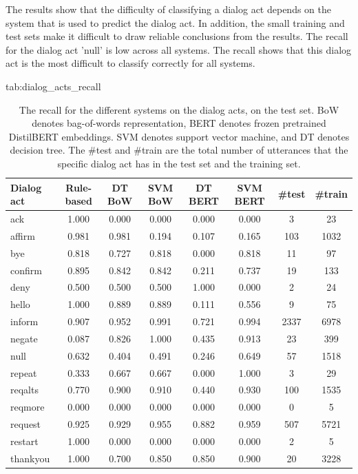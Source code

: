 \documentclass{midl} %
\begin{document}
The results show that the difficulty of classifying a dialog act depends on the system that is used to predict the dialog act.
In addition, the small training and test sets make it difficult to draw reliable conclusions from the results.
The recall for the dialog act 'null' is low across all systems. The recall shows that this dialog act is the most difficult to classify correctly for all systems.


\begin{table}[htbp]
\centering
\floatconts
  {tab:dialog_acts_recall}%
  {\caption{
    The recall for the different systems on the dialog acts, on the test set. BoW denotes bag-of-words representation, 
    BERT denotes frozen pretrained DistilBERT embeddings. 
    SVM denotes support vector machine, and DT denotes decision tree.
    The \#test and \#train are the total number of utterances that the specific dialog act has in the test set and the training set.
  }}%
  {\begin{tabular}{lccccccc}
  \bfseries Dialog act & \bfseries Rule-based & \bfseries DT BoW & 
  \bfseries SVM BoW & \bfseries DT BERT & \bfseries SVM BERT &
  \bfseries \#test & \bfseries \#train \\ 
  \hline
  ack       & 1.000 & 0.000 & 0.000 & 0.000 & 0.000 & 3 & 23 \\
  affirm    & 0.981 & 0.981 & 0.194 & 0.107 & 0.165 & 103 & 1032 \\
  bye       & 0.818 & 0.727 & 0.818 & 0.000 & 0.818 & 11 & 97 \\
  confirm   & 0.895 & 0.842 & 0.842 & 0.211 & 0.737 & 19 & 133 \\
  deny      & 0.500 & 0.500 & 0.500 & 1.000 & 0.000 & 2 & 24 \\
  hello     & 1.000 & 0.889 & 0.889 & 0.111 & 0.556 & 9 & 75 \\
  inform    & 0.907 & 0.952 & 0.991 & 0.721 & 0.994 & 2337 & 6978 \\
  negate    & 0.087 & 0.826 & 1.000 & 0.435 & 0.913 & 23 & 399 \\
  null      & 0.632 & 0.404 & 0.491 & 0.246 & 0.649 & 57 & 1518 \\
  repeat    & 0.333 & 0.667 & 0.667 & 0.000 & 1.000 & 3 & 29 \\
  reqalts   & 0.770 & 0.900 & 0.910 & 0.440 & 0.930 & 100 & 1535 \\
  reqmore   & 0.000 & 0.000 & 0.000 & 0.000 & 0.000 & 0 & 5 \\
  request   & 0.925 & 0.929 & 0.955 & 0.882 & 0.959 & 507 & 5721 \\
  restart   & 1.000 & 0.000 & 0.000 & 0.000 & 0.000 & 2 & 5 \\
  thankyou  & 1.000 & 0.700 & 0.850 & 0.850 & 0.900 & 20 & 3228 \\
  \end{tabular}}
\end{table}
\end{document}
